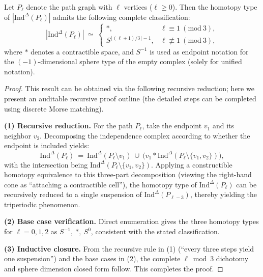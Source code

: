 \begin{lemma}\label{lem:pom-independence-complex-path}
Let \(P_{\ell}\) denote the path graph with \(\ell\) vertices (\(\ell\ge 0\)).
Then the homotopy type of \(|\mathrm{Ind}^{\Delta}(P_{\ell})|\) admits the following complete classification:
\[
|\mathrm{Ind}^{\Delta}(P_{\ell})|
\ \simeq\
\begin{cases}
\ast, & \ell\equiv 1\ (\mathrm{mod}\ 3),\\[2pt]
S^{\lfloor(\ell+1)/3\rfloor-1}, & \ell\not\equiv 1\ (\mathrm{mod}\ 3),
\end{cases}
\]
where \(\ast\) denotes a contractible space, and \(S^{-1}\) is used as endpoint notation for the \((-1)\)-dimensional sphere type of the empty complex (solely for unified notation).
\end{lemma}

\begin{proof}
This result can be obtained via the following recursive reduction; here we present an auditable recursive proof outline (the detailed steps can be completed using discrete Morse matching).
\par
\textbf{(1) Recursive reduction.}
For the path \(P_{\ell}\), take the endpoint \(v_1\) and its neighbor \(v_2\). Decomposing the independence complex according to whether the endpoint is included yields:
\[
\mathrm{Ind}^{\Delta}(P_{\ell})
\ =\
\mathrm{Ind}^{\Delta}(P_{\ell}\setminus v_1)\ \cup\
\bigl(v_1\ast \mathrm{Ind}^{\Delta}(P_{\ell}\setminus\{v_1,v_2\})\bigr),
\]
with the intersection being
\(
\mathrm{Ind}^{\Delta}(P_{\ell}\setminus\{v_1,v_2\})
\).
Applying a constructible homotopy equivalence to this three-part decomposition (viewing the right-hand cone as ``attaching a contractible cell''),
the homotopy type of \(\mathrm{Ind}^{\Delta}(P_{\ell})\) can be recursively reduced to a single suspension of \(\mathrm{Ind}^{\Delta}(P_{\ell-3})\), thereby yielding the triperiodic phenomenon.
\par
\textbf{(2) Base case verification.}
Direct enumeration gives the three homotopy types for \(\ell=0,1,2\) as
\(
S^{-1},\ \ast,\ S^{0}
\),
consistent with the stated classification.
\par
\textbf{(3) Inductive closure.}
From the recursive rule in (1) (``every three steps yield one suspension'') and the base cases in (2),
the complete \(\ell\bmod 3\) dichotomy and sphere dimension closed form follow.
This completes the proof.
\end{proof}

